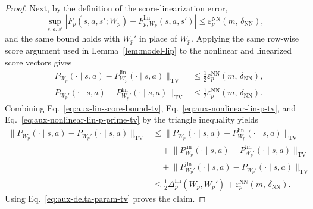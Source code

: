 \documentclass[10pt,a4paper]{amsart}
\begin{document}
\begin{proof}
Next, by the definition of the score-linearization error,
\[
\sup_{s,a,s'}\left| F_p(s,a,s';W_p)-F_{p,W_p}^{\mathrm{lin}}(s,a,s') \right| \le \varepsilon_{p}^{\mathrm{NN}}(m,\,\delta_{\mathrm{NN}}),
\]
and the same bound holds with \(W_p'\) in place of \(W_p\). Applying the same row-wise score argument used in Lemma~\ref{lem:model-lip} to the nonlinear and linearized score vectors gives
\begin{align}
\bigl\|P_{W_p}(\cdot\mid s,a)-P_{W_p}^{\mathrm{lin}}(\cdot\mid s,a)\bigr\|_{\mathrm{TV}}
&\le \frac{1}{2}\varepsilon_{p}^{\mathrm{NN}}(m,\,\delta_{\mathrm{NN}}),
\label{eq:aux-nonlinear-lin-p-tv}\\
\bigl\|P_{W_p'}(\cdot\mid s,a)-P_{W_p'}^{\mathrm{lin}}(\cdot\mid s,a)\bigr\|_{\mathrm{TV}}
&\le \frac{1}{2}\varepsilon_{p}^{\mathrm{NN}}(m,\,\delta_{\mathrm{NN}}).
\label{eq:aux-nonlinear-lin-p-prime-tv}
\end{align}
Combining Eq.~\ref{eq:aux-lin-score-bound-tv}, Eq.~\ref{eq:aux-nonlinear-lin-p-tv}, and Eq.~\ref{eq:aux-nonlinear-lin-p-prime-tv} by the triangle inequality yields
\begin{align*}
\bigl\|P_{W_p}(\cdot\mid s,a)-P_{W_p'}(\cdot\mid s,a)\bigr\|_{\mathrm{TV}}
&\le \bigl\|P_{W_p}(\cdot\mid s,a)-P_{W_p}^{\mathrm{lin}}(\cdot\mid s,a)\bigr\|_{\mathrm{TV}} \\
&\quad+ \bigl\|P_{W_p}^{\mathrm{lin}}(\cdot\mid s,a)-P_{W_p'}^{\mathrm{lin}}(\cdot\mid s,a)\bigr\|_{\mathrm{TV}} \\
&\quad+ \bigl\|P_{W_p'}^{\mathrm{lin}}(\cdot\mid s,a)-P_{W_p'}(\cdot\mid s,a)\bigr\|_{\mathrm{TV}}\\
&\le \frac{1}{2}\Delta_p^{\mathrm{lin}}(W_p,W_p')+\varepsilon_{p}^{\mathrm{NN}}(m,\,\delta_{\mathrm{NN}}).
\end{align*}
Using Eq.~\ref{eq:aux-delta-param-tv} proves the claim.


\end{proof}
\end{document}
